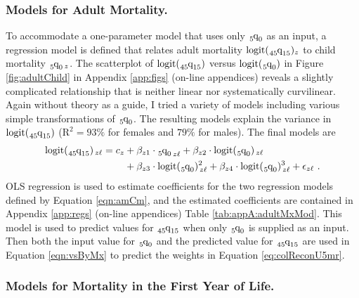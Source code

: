 \documentclass[11pt]{article}
\newcommand{\qf}{\tensor*[_5]{\mbox{q}}{_0}}
\newcommand{\qff}{\tensor*[_{45}]{\mbox{q}}{_{15}}}
\newcommand{\logit}{\mbox{logit}}
\begin{document}
\subsubsection{Models for Adult Mortality. \label{sec:modsAdultMx}} 

To accommodate a one-parameter model that uses only $\qf$ as an input, a regression model is defined that relates adult mortality $\logit(\qff)_{z}$ to child mortality $\qf_{\, z}$.  The scatterplot of $\logit(\qff)$ versus $\logit(\qf)$ in Figure \ref{fig:adultChild} in Appendix \ref{app:figs} (on-line appendices) reveals a slightly complicated relationship that is neither linear nor systematically curvilinear.  Again without theory as a guide, I tried a variety of models including various simple transformations of $\qf$.  The resulting models explain  the variance in $\logit(\qff)$ ($\mbox{R}^2 = 93\%$ for females and $79\%$ for males).  The final models are%
%
\begin{align}
\logit(\qff)_{\, z\ell} = c_z &+ \beta_{z1} \cdot {\qf}_{\, z\ell} + \beta_{z2} \cdot \logit(\qf)_{\, z\ell} \nonumber \\
&+ \beta_{z3} \cdot \logit(\qf)^2_{\, z\ell} + \beta_{z4} \cdot \logit(\qf)^3_{\, z\ell} + \epsilon_{z\ell} \ . \label{eqn:amCm}
\end{align}%
%
OLS regression is used to estimate coefficients for the two regression models defined by Equation \ref{eqn:amCm}, and the estimated coefficients are contained in Appendix \ref{app:regs} (on-line appendices) Table \ref{tab:appA:adultMxMod}.  This model is used to predict values for $\qff$ when only $\qf$ is supplied as an input.  Then both the input value for $\qf$ and the predicted value for $\qff$ are used in Equation \ref{eqn:vsByMx} to predict the weights in Equation \ref{eq:colReconU5mr}.   

\subsubsection{Models for Mortality in the First Year of Life. \label{sec:modsInfMx}} 
\end{document}
